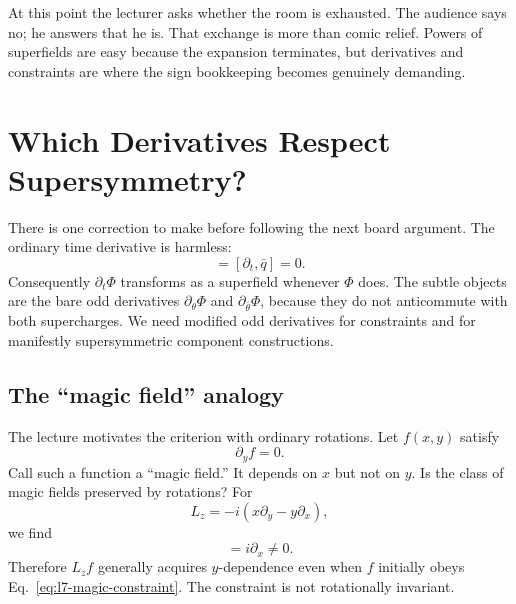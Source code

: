 At this point the lecturer asks whether the room is exhausted. The audience says no; he answers that he is. That exchange is more than comic relief. Powers of superfields are easy because the expansion terminates, but derivatives and constraints are where the sign bookkeeping becomes genuinely demanding.

\section{Which Derivatives Respect Supersymmetry?}

There is one correction to make before following the next board argument. The ordinary time derivative is harmless:
\begin{equation}
[\partial_t,q]=[\partial_t,\bar q]=0.
\end{equation}
Consequently \(\partial_t\Phi\) transforms as a superfield whenever \(\Phi\) does. The subtle objects are the bare odd derivatives \(\partial_\theta\Phi\) and \(\partial_{\bar\theta}\Phi\), because they do not anticommute with both supercharges. We need modified odd derivatives for constraints and for manifestly supersymmetric component constructions.

\subsection{The ``magic field'' analogy}

The lecture motivates the criterion with ordinary rotations. Let \(f(x,y)\) satisfy
\begin{equation}
\partial_y f=0.
\label{eq:l7-magic-constraint}
\end{equation}
Call such a function a ``magic field.'' It depends on \(x\) but not on \(y\). Is the class of magic fields preserved by rotations? For
\begin{equation}
L_z=-i\left(x\partial_y-y\partial_x\right),
\end{equation}
we find
\begin{equation}
[\partial_y,L_z]=i\partial_x\neq0.
\end{equation}
Therefore \(L_z f\) generally acquires \(y\)-dependence even when \(f\) initially obeys Eq.~\eqref{eq:l7-magic-constraint}. The constraint is not rotationally invariant.

